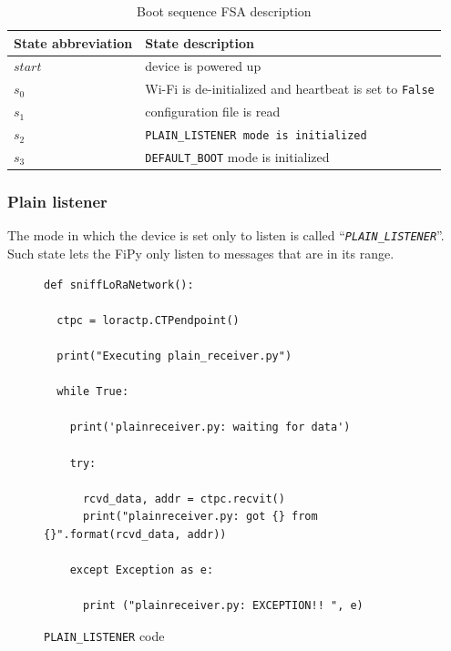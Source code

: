 				\begin{table}[h]
					\begin{center}
						\begin{tabularx}{0.85\textwidth}{@{}|Y|Y|@{}} 
							\hline
							State abbreviation & State description \\\hline
							$start$ & device is powered up\\\hline
							$s_{0}$ & Wi-Fi is de-initialized and heartbeat is set to \texttt{False}\\\hline
							$s_{1}$ & configuration file is read\\\hline
							$s_{2}$ & \texttt{PLAIN\_LISTENER mode is initialized}\\\hline
							$s_{3}$ & \texttt{DEFAULT\_BOOT} mode is initialized\\\hline
						\end{tabularx}
						\caption{Boot sequence FSA description}
						\label{table:fsa_boot}
					\end{center}
				\end{table}

			\newpage
			\subsubsection{Plain listener}
			
				The mode in which the device is set only to listen is called ``\textit{\texttt{PLAIN\_LISTENER}}''.
				Such state lets the FiPy only listen to messages that are in its range.
				
				\begin{figure}[H]
					\begin{lstlisting}
def sniffLoRaNetwork():

  ctpc = loractp.CTPendpoint()

  print("Executing plain_receiver.py")

  while True:

    print('plainreceiver.py: waiting for data')

    try:

      rcvd_data, addr = ctpc.recvit()
      print("plainreceiver.py: got {} from {}".format(rcvd_data, addr))

    except Exception as e:

      print ("plainreceiver.py: EXCEPTION!! ", e)
					\end{lstlisting}
					\caption{\texttt{PLAIN\_LISTENER} code}
					\label{code:plain_listener}
				\end{figure}
			
